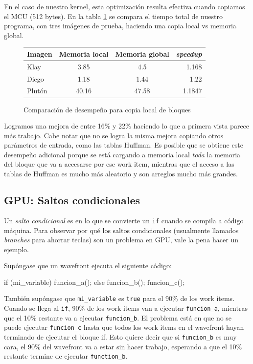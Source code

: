 {En el caso de nuestro kernel, esta optimización resulta efectiva cuando
copiamos el \gls{MCU} (512 bytes). En la tabla \ref{fig:gpucopy} se compara el tiempo
total de nuestro programa, con tres imágenes de prueba, haciendo una copia
local vs memoria global.

\begin{figure}[h]
    \begin{tabular}{ |l c c r| }
        \hline
        Imagen & Memoria local & Memoria global & \emph{speedup} \\
        \hline
        Klay & 3.85 & 4.5 & 1.168 \\
        Diego & 1.18 & 1.44 & 1.22 \\
        Plutón & 40.16 & 47.58 & 1.1847 \\
        \hline
    \end{tabular}
    \caption{Comparación de desempeño para copia local de bloques}
    \label{fig:gpucopy}
\end{figure}

Logramos una mejora de entre 16\% y 22\% haciendo lo que a primera vista parece
más trabajo. Cabe notar que no se logra la misma mejora copiando otros
parámetros de entrada, como las tablas Huffman. Es posible que se obtiene este
desempeño adicional porque se está cargando a memoria local \emph{toda} la
memoria del bloque que va a accesarse por ese work item, mientras que el acceso
a las tablas de Huffman es mucho más aleatorio y son arreglos mucho más
grandes.

\subsection{GPU: Saltos condicionales}

Un \emph{ salto condicional } es en lo que se convierte un \verb+if+ cuando
se compila a código máquina. Para observar por qué los saltos condicionales
(usualmente llamados \emph{branches} para ahorrar teclas) son un problema en
GPU, vale la pena hacer un ejemplo.

Supóngase que un wavefront ejecuta el siguiente código:

\begin{code}[language=C][h]
    if (mi_variable) {
        funcion_a();
    } else {
        funcion_b();
    }
    funcion_c();
\end{code}

También supóngase que \verb+mi_variable+ es \verb+true+ para el 90\% de los work
items.  Cuando se llega al \verb+if+, 90\% de los work items van a ejecutar
\verb+funcion_a+, mientras que el 10\% restante va a ejecutar \verb+funcion_b+.
El problema está en que no se puede ejecutar \verb+funcion_c+ hasta que todos
los work items en el wavefront hayan terminado de ejecutar el bloque if. Esto
quiere decir que si \verb+funcion_b+ es muy cara, el 90\% del wavefront va a
estar sin hacer trabajo, esperando a que el 10\% restante termine de ejecutar
\verb+function_b+.

}
